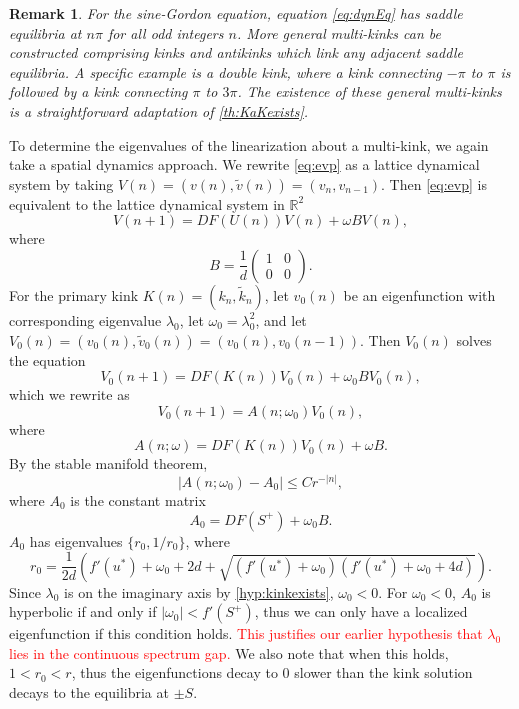 \documentclass[12pt,reqno]{amsart}
\def\R{{\mathbb R}}
\newtheorem{remark}{Remark}
\newcommand{\revised}[1]{ \textcolor{red}{#1} }
\begin{document}
\begin{remark}\label{rem:SGmulitkinks}
For the sine-Gordon equation, equation \cref{eq:dynEq} has saddle equilibria at $n \pi$ for all odd integers $n$. More general multi-kinks can be constructed comprising kinks and antikinks which link any adjacent saddle equilibria. A specific example is a double kink, where a kink  connecting $-\pi$ to $\pi$ is followed by a kink connecting $\pi$ to $3 \pi$. The existence of these general multi-kinks is a straightforward adaptation of \cref{th:KaKexists}.
\end{remark}

To determine the eigenvalues of the linearization about a multi-kink, we again take a spatial dynamics approach. We rewrite \cref{eq:evp} as a lattice dynamical system by taking $V(n) = (v(n), \tilde{v}(n)) = (v_n, v_{n-1})$. Then \cref{eq:evp} is equivalent to the lattice dynamical system in $\R^2$
\begin{equation}\label{eq:EVPdyneq}
V(n+1) = D F( U(n) )V(n) + \omega B V(n),
\end{equation}
where
\[
B = \frac{1}{d}
\begin{pmatrix}1 & 0 \\ 0 & 0
\end{pmatrix}.
\] 
For the primary kink $K(n) = (k_n, \tilde{k}_n)$, let $v_0(n)$ be an eigenfunction with corresponding eigenvalue $\lambda_0$, let $\omega_0 = \lambda_0^2$, and let $V_0(n) = (v_0(n), \tilde{v}_0(n)) = (v_0(n), v_0(n-1))$. Then $V_0(n)$ solves the equation
\begin{equation}\label{eq:V0eq}
V_0(n+1) = D F( K(n) )V_0(n) + \omega_0 B V_0(n),
\end{equation}
which we rewrite as
\begin{equation}\label{eq:V0Aeq}
	V_0(n+1) = A(n; \omega_0) V_0(n),
\end{equation}
where
\begin{equation}\label{eq:Aomegaeq}
	A(n; \omega) = D F( K(n) )V_0(n) + \omega B.
\end{equation}
By the stable manifold theorem, 
\begin{equation}\label{eq:A0decay}
	|A(n; \omega_0) - A_0| \leq C r^{-|n|},
\end{equation}
where $A_0$ is the constant matrix
\begin{equation}
	A_0 = DF(S^+) + \omega_0 B.
\end{equation}
$A_0$ has eigenvalues $\{ r_0, 1/r_0 \}$, where
\begin{equation}\label{eq:r0}
r_0 = \frac{1}{2d}\left( f'(u^*) + \omega_0 + 2d + \sqrt{(f'(u^*)+ \omega_0)(f'(u^*) + \omega_0 + 4d)} \right).
\end{equation}
Since $\lambda_0$ is on the imaginary axis by \cref{hyp:kinkexists}, $\omega_0 < 0$. For $\omega_0 < 0$, $A_0$ is hyperbolic if and only if $|\omega_0| < f'(S^+)$, thus we can only have a localized eigenfunction if this condition holds. \revised{This justifies our earlier hypothesis that $\lambda_0$ lies in the continuous spectrum gap.} We also note that when this holds, $1 < r_0 < r$, thus the eigenfunctions decay to 0 slower than the kink solution decays to the equilibria at $\pm S$.
\end{document}
